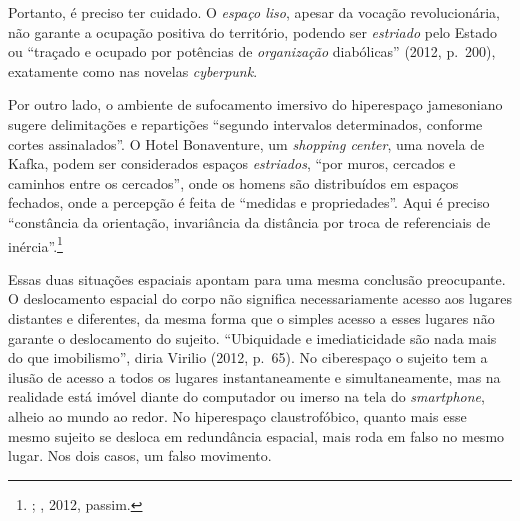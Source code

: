 Portanto, é preciso ter cuidado. O \emph{espaço liso}, apesar da vocação
revolucionária, não garante a ocupação positiva do território, podendo
ser \emph{estriado} pelo Estado ou ``traçado e ocupado por potências de
\emph{organização} diabólicas'' (2012, p.~200), exatamente como nas
novelas \emph{cyberpunk}.

Por outro lado, o ambiente de sufocamento imersivo do hiperespaço
jamesoniano sugere delimitações e repartições ``segundo intervalos
determinados, conforme cortes assinalados''. O Hotel Bonaventure, um
\emph{shopping center}, uma novela de Kafka, podem ser considerados espaços
\emph{estriados}, ``por muros, cercados e caminhos entre os cercados'',
onde os homens são distribuídos em espaços fechados, onde a percepção é
feita de ``medidas e propriedades''. Aqui é preciso ``constância da
orientação, invariância da distância por troca de referenciais de
inércia''.\footnote{; , 2012, passim.}

Essas duas situações espaciais apontam para uma mesma conclusão
preocupante. O deslocamento espacial do corpo não significa
necessariamente acesso aos lugares distantes e diferentes, da mesma
forma que o simples acesso a esses lugares não garante o deslocamento do
sujeito. ``Ubiquidade e imediaticidade são nada mais do que
imobilismo'', diria Virilio (2012, p.~65). No ciberespaço o sujeito tem
a ilusão de acesso a todos os lugares instantaneamente e
simultaneamente, mas na realidade está imóvel diante do computador ou
imerso na tela do \emph{smartphone}, alheio ao mundo ao redor. No
hiperespaço claustrofóbico, quanto mais esse mesmo sujeito se desloca em
redundância espacial, mais roda em falso no mesmo lugar. Nos dois casos,
um falso movimento.

